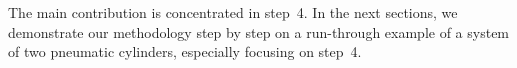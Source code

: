 \documentclass[conference]{IEEEtran}
\begin{document}
The main contribution is concentrated in step~4.
In the next sections, we demonstrate our methodology step by step on a run-through example of a system of two pneumatic cylinders, especially focusing on step~4.




\end{document}
